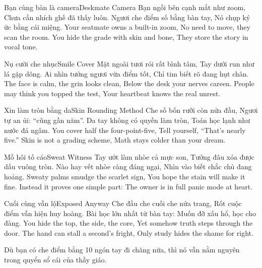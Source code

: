 \begin{tutuyetbox}{Bạn cùng bàn là camera}{Deskmate Camera}
Bạn ngồi bên cạnh mắt như zoom,
Chưa cần nhích ghế đã thấy luôn.
Ngươi che điểm số bằng bàn tay,
Nó chụp ký ức bằng cái miệng.
\tcblower
Your seatmate owns a built-in zoom,
No need to move, they scan the room.
You hide the grade with skin and bone,
They store the story in vocal tone.
\end{tutuyetbox}

\begin{tutuyetbox}{Nụ cười che nhục}{Smile Cover}
Mặt ngoài tươi rói rất bình tâm,
Tay dưới run như lá gặp dông.
Ai nhìn tưởng ngươi vừa điểm tốt,
Chỉ tim biết rõ đang hụt chân.
\tcblower
The face is calm, the grin looks clean,
Below the desk your nerves careen.
People may think you topped the test,
Your heartbeat knows the real unrest.
\end{tutuyetbox}

\begin{tutuyetbox}{Xin làm tròn bằng da}{Skin Rounding Method}
Che số bốn rưỡi còn nửa đầu,
Ngươi tự an ủi: “cũng gần năm”.
Da tay không có quyền làm tròn,
Toán học lạnh như nước đá ngâm.
\tcblower
You cover half the four-point-five,
Tell yourself, “That's nearly five.”
Skin is not a grading scheme,
Math stays colder than your dream.
\end{tutuyetbox}

\begin{tutuyetbox}{Mồ hôi tố cáo}{Sweat Witness}
Tay ướt làm nhòe cả mực son,
Tưởng đâu xóa được dấu vuông tròn.
Nào hay vết nhòe càng đáng ngại,
Nhìn vào biết chắc chủ đang hoảng.
\tcblower
Sweaty palms smudge the scarlet sign,
You hope the stain will make it fine.
Instead it proves one simple part:
The owner is in full panic mode at heart.
\end{tutuyetbox}

\begin{tutuyetbox}{Cuối cùng vẫn lộ}{Exposed Anyway}
Che đầu che cuối che nửa trang,
Rốt cuộc điểm vẫn hiện huy hoàng.
Bài học lớn nhất từ bàn tay:
Muốn đỡ xấu hổ, học cho đàng.
\tcblower
You hide the top, the side, the core,
Yet somehow truth steps through the door.
The hand can stall a second's fright,
Only study hides the shame for right.
\end{tutuyetbox}
\begin{ghichu}
Dù bạn có che điểm bằng 10 ngón tay đi chăng nữa, thì nó vẫn nằm nguyên trong quyển sổ cái của thầy giáo.
\end{ghichu}